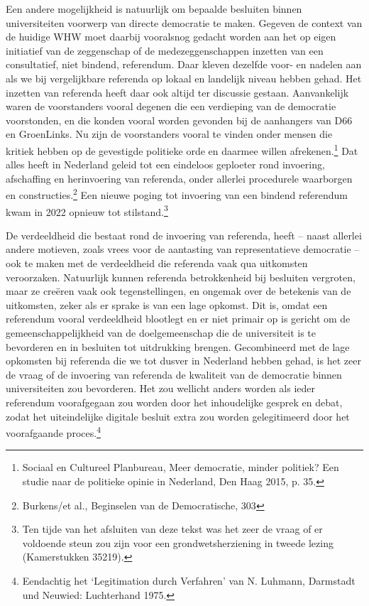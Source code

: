\documentclass{jote-book}
\begin{document}
	Een andere mogelijkheid is natuurlijk om bepaalde besluiten binnen universiteiten voorwerp van directe democratie te maken. Gegeven de context van de huidige WHW moet daarbij vooralsnog gedacht worden aan het op eigen initiatief van de zeggenschap of de medezeggenschappen inzetten van een consultatief, niet bindend, referendum. Daar kleven dezelfde voor- en nadelen aan als we bij vergelijkbare referenda op lokaal en landelijk niveau hebben gehad. Het inzetten van referenda heeft daar ook altijd ter discussie gestaan. Aanvankelijk waren de voorstanders vooral degenen die een verdieping van de democratie voorstonden, en die konden vooral worden gevonden bij de aanhangers van D66 en GroenLinks. Nu zijn de voorstanders vooral te vinden onder mensen die kritiek hebben op de gevestigde politieke orde en daarmee willen afrekenen.\footnote{Sociaal en Cultureel Planbureau, Meer democratie, minder politiek? Een studie naar de politieke opinie in Nederland, Den Haag 2015, p. 35. } Dat alles heeft in Nederland geleid tot een eindeloos geploeter rond invoering, afschaffing en herinvoering van referenda, onder allerlei procedurele waarborgen en constructies.\footnote{Burkens/et al., Beginselen van de Democratische, 303} Een nieuwe poging tot invoering van een bindend referendum kwam in 2022 opnieuw tot stilstand.\footnote{Ten tijde van het afsluiten van deze tekst was het zeer de vraag of er voldoende steun zou zijn voor een grondwetsherziening in tweede lezing (Kamerstukken 35219).}



	De verdeeldheid die bestaat rond de invoering van referenda, heeft -- naast allerlei andere motieven, zoals vrees voor de aantasting van representatieve democratie -- ook te maken met de verdeeldheid die referenda vaak qua uitkomsten veroorzaken. Natuurlijk kunnen referenda betrokkenheid bij besluiten vergroten, maar ze creëren vaak ook tegenstellingen, en ongemak over de betekenis van de uitkomsten, zeker als er sprake is van een lage opkomst. Dit is, omdat een referendum vooral verdeeldheid blootlegt en er niet primair op is gericht om de gemeenschappelijkheid van de doelgemeenschap die de universiteit is te bevorderen en in besluiten tot uitdrukking brengen. Gecombineerd met de lage opkomsten bij referenda die we tot dusver in Nederland hebben gehad, is het zeer de vraag of de invoering van referenda de kwaliteit van de democratie binnen universiteiten zou bevorderen. Het zou wellicht anders worden als ieder referendum voorafgegaan zou worden door het inhoudelijke gesprek en debat, zodat het uiteindelijke digitale besluit extra zou worden gelegitimeerd door het voorafgaande proces.\footnote{Eendachtig het ‘Legitimation durch Verfahren' van N. Luhmann, Darmstadt und Neuwied: Luchterhand 1975.}
\end{document}

